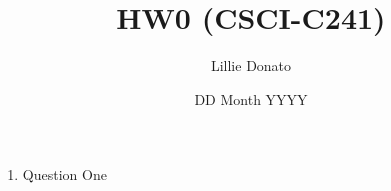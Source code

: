 \documentclass{article}
\title{HW0 (CSCI-C241)}
\author{Lillie Donato}
\date{DD Month YYYY}
\begin{document}
\maketitle

\begin{enumerate}
    \item Question One
\end{enumerate}
\end{document}
